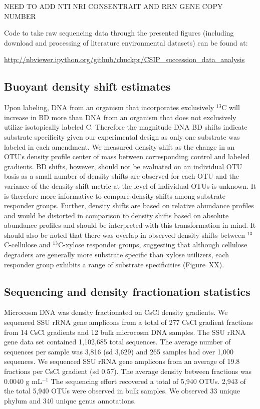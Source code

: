 \documentclass{article}
\begin{document}
NEED TO ADD NTI NRI CONSENTRAIT AND RRN GENE COPY NUMBER 

Code to take raw sequencing data through the presented figures (including
download and processing of literature environmental datasets) can be
found at:

\url{http://nbviewer.ipython.org/github/chuckpr/CSIP_succession_data_analysis}

\subsection{Buoyant density shift estimates}\label{BD}
Upon labeling, DNA from an organism that incorporates exclusively $^{13}$C will
increase in BD more than DNA from an organism that does not exclusively utilize
isotopically labeled C. Therefore the magnitude DNA BD shifts indicate
substrate specificity given our experimental design as only one substrate was
labeled in each amendment. We measured density shift as the change in an OTU's
density profile center of mass between corresponding control and labeled
gradients. BD shifts, however, should not be evaluated on an individual OTU
basis as a small number of density shifts are observed for each OTU and the
variance of the density shift metric at the level of individual OTUs is
unknown. It is therefore more informative to compare density shifts among
substrate responder groups. Further, density shifts are based on relative
abundance profiles and would be distorted in comparison to density shifts based
on absolute abundance profiles and should be interpreted with this
transformation in mind. It should also be noted that there was overlap in
observed density shifts between $^{13}$C-cellulose and $^{13}$C-xylose
responder groups, suggesting that although cellulose degraders are generally
more substrate specific than xylose utilizers, each responder group exhibits
a range of substrate specificities (Figure~XX). 

\subsection{Sequencing and density fractionation statistics}\label{seq_stats}
Microcosm DNA was density fractionated on CsCl density gradients. We sequenced
SSU rRNA gene amplicons from a total of 277 CsCl gradient fractions from 14
CsCl gradients and 12 bulk microcosm DNA samples. The SSU rRNA gene data set
contained 1,102,685 total sequences. The average number of sequences per sample
was 3,816 (sd 3,629) and 265 samples had over 1,000 sequences. We sequenced SSU
rRNA gene amplicons from an average of
19.8 fractions per CsCl gradient (sd 0.57). The average density between
fractions was  0.0040 g mL$^{-1}$ The sequencing effort recovered a total of
5,940 OTUs. 2,943 of the total 5,940 OTUs were observed in bulk samples. We
observed 33 unique phylum and 340 unique genus annotations.
\end{document}
